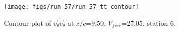 \begin{figure}[H]
\centering
\texttt{[image: figs/run\_57/run\_57\_tt\_contour]}
\caption{Contour plot of $\overline{v_{\theta}^{\prime} v_{\theta}^{\prime}}$ at $z/c$=9.50, $V_{free}$=27.05, station 6.}
\label{fig:run_57_tt_contour}
\end{figure}


